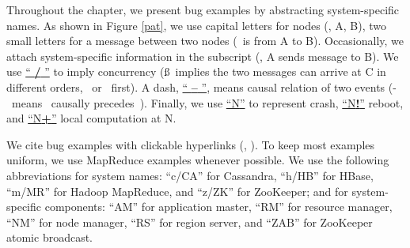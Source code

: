 Throughout the chapter, we present bug examples by abstracting
system-specific names.  As shown in Figure \ref{pat}, we use capital
letters for nodes (\eg, A, B), two small letters for a message between
two nodes (\mab\ is from A to B).  Occasionally, we attach
system-specific information in the subscript (\eg, A
sends \mab{} message to B).
%
We use \underline{`` \textbf{/} ''} to imply concurrency
(\mac\ss\mbc\ implies the two messages can arrive at C in different
orders, \mac\ or \mbc\ first).
%
A dash, \underline{`` {\bf --} ''}, means causal relation of two
events (\mab-\mbc\ means \mab\ causally precedes\ \mbc).
%
Finally, we use \underline{``N{\bf *}''} to represent crash,
\underline{``N{\bf !}''} reboot, and \underline{``N{\bf +}''} local
computation at N.


We cite bug examples with clickable hyperlinks (\eg, ).
%
To keep most examples uniform, we use MapReduce examples whenever
possible.
%
%
%
We use the following abbreviations for system names:
``c/CA'' for Cassandra,
``h/HB'' for HBase, 
``m/MR'' for Hadoop MapReduce, and
``z/ZK'' for ZooKeeper;
% 
and for system-specific components:
``AM'' for application master,
``RM'' for resource manager,
``NM'' for node manager, 
``RS'' for region server, and
``ZAB'' for ZooKeeper atomic broadcast.


